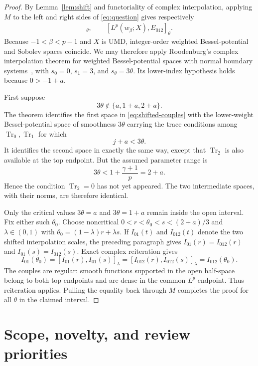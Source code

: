 \documentclass[11pt]{article}
\newcommand{\Tr}{\operatorname{Tr}}
\newcommand{\M}{M}
\begin{document}
\begin{proof}
By Lemma~\ref{lem:shift} and functoriality of complex interpolation, applying
$\M$ to the left and right sides of \eqref{eq:question} gives respectively
\begin{align}
 [L^p(w_\beta;X),E_{01}]_\theta,
 \qquad
 [L^p(w_\beta;X),E_{012}]_\theta.\label{eq:shifted-couples}
\end{align}
Because $-1<\beta<p-1$ and $X$ is UMD, integer-order weighted Bessel-potential
and Sobolev spaces coincide.  We may therefore apply Roodenburg's complex
interpolation theorem for weighted Bessel-potential spaces with normal
boundary systems~\cite[Theorem 6.4]{interpolation}, with
$s_0=0$, $s_1=3$, and $s_\theta=3\theta$.  Its lower-index hypothesis holds
because $0>-1+a$.

First suppose
\[
 3\theta\notin\{a,1+a,2+a\}.
\]
The theorem identifies the first space in \eqref{eq:shifted-couples} with
the lower-weight Bessel-potential space of smoothness $3\theta$ carrying
the trace conditions among $\Tr_0,\Tr_1$ for which
\[
 j+a<3\theta.
\]
It identifies the second space in exactly the same way, except that
$\Tr_2$ is also available at the top endpoint.  But the assumed parameter
range is
\[
 3\theta<1+\frac{\gamma+1}{p}=2+a.
\]
Hence the condition $\Tr_2=0$ has not yet appeared.  The two intermediate
spaces, with their norms, are therefore identical.

Only the critical values $3\theta=a$ and $3\theta=1+a$ remain inside the open
interval.  Fix either such $\theta_0$.  Choose noncritical
$0<r<\theta_0<s<(2+a)/3$ and $\lambda\in(0,1)$ with
$\theta_0=(1-\lambda)r+\lambda s$.  If $I_{01}(t)$ and $I_{012}(t)$ denote
the two shifted interpolation scales, the preceding paragraph gives
$I_{01}(r)=I_{012}(r)$ and $I_{01}(s)=I_{012}(s)$.  Exact complex
reiteration gives
\[
 I_{01}(\theta_0)
 =[I_{01}(r),I_{01}(s)]_\lambda
 =[I_{012}(r),I_{012}(s)]_\lambda
 =I_{012}(\theta_0).
\]
The couples are regular: smooth functions supported in the open half-space
belong to both top endpoints and are dense in the common $L^p$ endpoint.
Thus reiteration applies.  Pulling the equality back through $\M$ completes
the proof for all $\theta$ in the claimed interval.
\end{proof}

\section{Scope, novelty, and review priorities}
\end{document}
